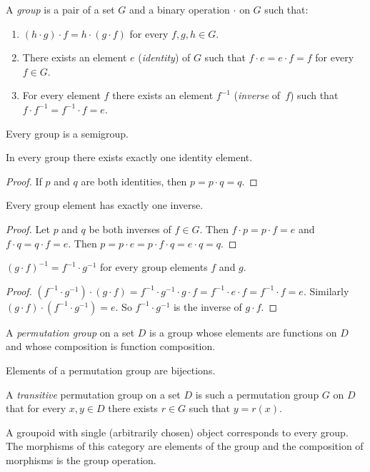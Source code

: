 \begin{defn}
A \emph{group} is a pair of a set $G$ and a binary operation
$\cdot$ on $G$ such that:
\begin{enumerate}
\item $(h\cdot g)\cdot f=h\cdot(g\cdot f)$ for every $f,g,h\in G$.
\item {}There exists an element $e$ (\emph{identity}) of
$G$ such that $f\cdot e=e\cdot f=f$ for every $f\in G$.
\item For every element $f$ there exists an element $f^{-1}$ (\emph{inverse} of~$f$) such that
$f\cdot f^{-1}=f^{-1}\cdot f=e$.
\end{enumerate}
\end{defn}
\begin{obvious}
Every group is a semigroup.\end{obvious}
\begin{prop}
In every group there exists exactly one identity element.\end{prop}
\begin{proof}
If $p$ and $q$ are both identities, then $p=p\cdot q=q$.\end{proof}
\begin{prop}
Every group element has exactly one inverse.\end{prop}
\begin{proof}
Let $p$ and $q$ be both inverses of $f\in G$. Then $f\cdot p=p\cdot f=e$
and $f\cdot q=q\cdot f=e$. Then $p=p\cdot e=p\cdot f\cdot q=e\cdot q=q$.\end{proof}
\begin{prop}
$(g\cdot f)^{-1}=f^{-1}\cdot g^{-1}$ for every group elements $f$
and $g$.\end{prop}
\begin{proof}
$(f^{-1}\cdot g^{-1})\cdot(g\cdot f)=f^{-1}\cdot g^{-1}\cdot g\cdot f=f^{-1}\cdot e\cdot f=f^{-1}\cdot f=e$.
Similarly $(g\cdot f)\cdot(f^{-1}\cdot g^{-1})=e$. So $f^{-1}\cdot g^{-1}$
is the inverse of $g\cdot f$.\end{proof}
\begin{defn}
A \emph{permutation group} on a set $D$
is a group whose elements are functions on $D$ and whose composition
is function composition.\end{defn}
\begin{obvious}
Elements of a permutation group are bijections.\end{obvious}
\begin{defn}
A \emph{transitive} permutation
group on a set $D$ is such a permutation group $G$ on $D$ that
for every $x,y\in D$ there exists $r\in G$ such that $y=r(x)$.
\end{defn}
A groupoid with single (arbitrarily chosen) object corresponds to
every group. The morphisms of this category are elements of the group
and the composition of morphisms is the group operation.
